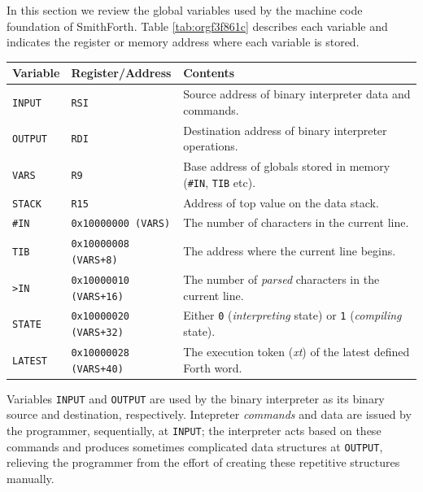 \documentclass[a4paper,12pt,final]{article}
\begin{document}
In this section we review the global variables used by the machine
code foundation of SmithForth.  Table \ref{tab:orgf3f861c} describes each
variable and indicates the register or memory address where each
variable is stored.

\begin{table}[!htbp] \begin{adjustwidth}{-1cm}{-1cm} \fontsize{10}{12.000000}\selectfont
\begin{center}
\begin{tabular}{l|l|l}
\textbf{Variable} & \textbf{Register}​/​\textbf{Address} & \textbf{Contents}\\[0pt]
\hline
\texttt{INPUT} & \texttt{RSI} & Source address of binary interpreter data and commands.\\[0pt]
\texttt{OUTPUT} & \texttt{RDI} & Destination address of binary interpreter operations.\\[0pt]
\texttt{VARS} & \texttt{R9} & Base address of globals stored in memory (\texttt{\#IN}, \texttt{TIB} etc).\\[0pt]
\texttt{STACK} & \texttt{R15} & Address of top value on the data stack.\\[0pt]
\hline
\texttt{\#IN} & \texttt{0x10000000 (VARS)} & The number of characters in the current line.\\[0pt]
\texttt{TIB} & \texttt{0x10000008 (VARS+8)} & The address where the current line begins.\\[0pt]
\texttt{>IN} & \texttt{0x10000010 (VARS+16)} & The number of \emph{parsed} characters in the current line.\\[0pt]
\texttt{STATE} & \texttt{0x10000020 (VARS+32)} & Either \texttt{0} (\emph{interpreting} state) or \texttt{1} (\emph{compiling} state).\\[0pt]
\texttt{LATEST} & \texttt{0x10000028 (VARS+40)} & The execution token (\emph{xt}) of the latest defined Forth word.\\[0pt]
\end{tabular}

\end{center}
\normalsize \end{adjustwidth} \end{table} \vspace{0}

Variables \texttt{INPUT} and \texttt{OUTPUT} are used by the binary interpreter as
its binary source and destination, respectively.  Intepreter
\emph{commands} and data are issued by the programmer, sequentially, at
\texttt{INPUT}; the interpreter acts based on these commands and produces
sometimes complicated data structures at \texttt{OUTPUT}, relieving the
programmer from the effort of creating these repetitive structures
manually.
\end{document}
